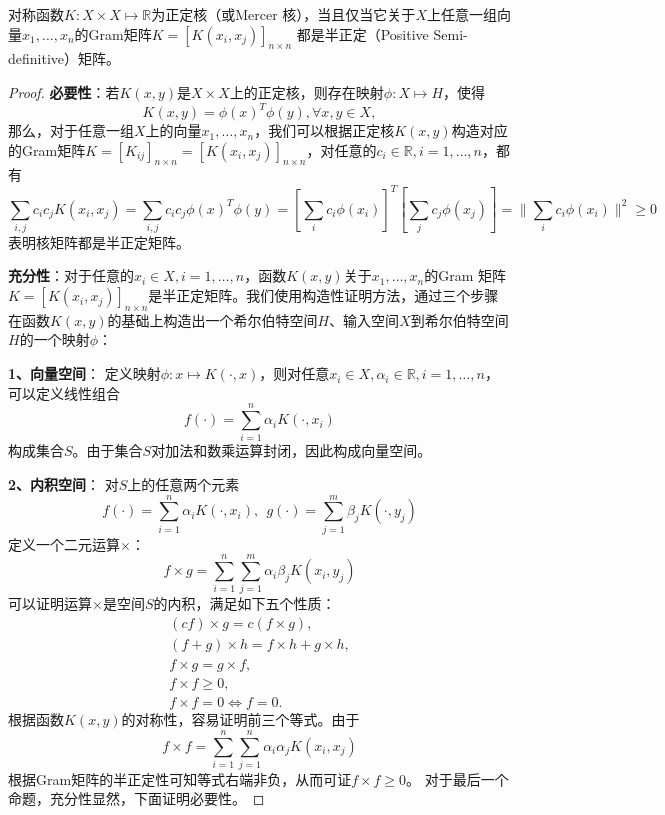 \begin{theorem}
对称函数$K:X\times X\mapsto \mathbb{R}$为正定核（或Mercer 核），当且仅当它关于$X$上任意一组向量$x_1,\ldots,x_n$的Gram矩阵$K = [K(x_i,x_j)]_{n\times n}$ 都是半正定（Positive Semi-definitive）矩阵。
\end{theorem}
\begin{proof}
\textbf{必要性}：若$K(x,y)$是$X\times X$上的正定核，则存在映射$\phi:X\mapsto H$，使得
\[
    K(x,y) = \phi(x)^T \phi(y), \forall x,y\in X,
\]
那么，对于任意一组$X$上的向量$x_1,\ldots,x_n$，我们可以根据正定核$K(x,y)$构造对应的Gram矩阵$K=[K_{ij}]_{n\times n} = [K(x_i,x_j)]_{n\times n}$，对任意的$c_i\in \mathbb{R},i=1,\ldots,n$，都有
\begin{equation}
    \sum\limits_{i,j} c_i c_j K(x_i,x_j) = \sum\limits_{i,j} c_i c_j \phi(x)^T \phi(y) = [\sum\limits_i c_i \phi(x_i)]^T[\sum\limits_j c_j\phi(x_j)] = \|\sum\limits_i c_i \phi(x_i)\|^2 \ge 0
\end{equation}
表明核矩阵都是半正定矩阵。

\textbf{充分性}：对于任意的$x_i\in X,i=1,\ldots,n$，函数$K(x,y)$关于$x_1,\ldots,x_n$的Gram 矩阵$K = [K(x_i,x_j)]_{n\times n}$是半正定矩阵。我们使用构造性证明方法，通过三个步骤在函数$K(x,y)$的基础上构造出一个希尔伯特空间$H$、输入空间$X$到希尔伯特空间$H$的一个映射$\phi$：

\noindent \textbf{1、向量空间}：
定义映射$\phi:x\mapsto K(\cdot,x)$，则对任意$x_i\in X,\alpha_i\in \mathbb{R},i=1,\ldots,n$，可以定义线性组合
\begin{equation}
    f(\cdot)=\sum\limits_{i=1}^n \alpha_i K(\cdot,x_i)
\end{equation}
构成集合$S$。由于集合$S$对加法和数乘运算封闭，因此构成向量空间。

\noindent \textbf{2、内积空间}：
对$S$上的任意两个元素
\[
    f(\cdot)=\sum\limits_{i=1}^n \alpha_i K(\cdot,x_i), ~~g(\cdot)=\sum\limits_{j=1}^m \beta_j K(\cdot,y_j)
\]
定义一个二元运算$\times$：
\[
    f\times g = \sum\limits_{i=1}^n \sum\limits_{j=1}^m \alpha_i \beta_j K(x_i,y_j)
\]
可以证明运算$\times$是空间$S$的内积，满足如下五个性质：
\begin{eqnarray}
  (cf)\times g = c(f\times g), \\
  (f+g)\times h = f\times h + g\times h, \\
  f \times g = g\times f, \\
  f\times f \ge 0, \\
  f\times f = 0 \Leftrightarrow f = 0.
\end{eqnarray}
根据函数$K(x,y)$的对称性，容易证明前三个等式。由于
\[
    f\times f = \sum\limits_{i=1}^n \sum\limits_{j=1}^n \alpha_i \alpha_j K(x_i,x_j)
\]
根据Gram矩阵的半正定性可知等式右端非负，从而可证$f\times f\ge 0$。 对于最后一个命题，充分性显然，下面证明必要性。


\end{proof}
